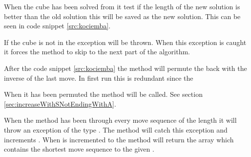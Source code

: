 When the cube has been solved from  it test if the length of the new solution is better than the old solution this will be saved as the new solution. 
This can be seen in code snippet \ref{src:kociemba}.

If the cube is not in   the exception  will be thrown.
 When this exception is caught it forces the  method to skip to the next part of the algorithm. 
 
\begin{comment}
 method to test if the cube is in \m{H}. 
 The method \vr{solveFromH} is called with a parameter, which determines how deep it will search.

If the \rubik{} is in \m{H} then \vr{solveFromH} will start solving it with \m{A} moves. If the \rubik{} is not inside \m{H} the \vr{solveFromH} will throw an exception called \vr{InvalidCubeException}. 

When the InvalidCubeException is caught by it cause 

\end{comment}

After the code snippet \ref{src:kociemba} the method will permute the \rubik{} back with the inverse of the last move. In first run this is redundant since the 

When it has been permuted the method  will be called. See section \ref{sec:increaseWithSNotEndingWithA}.

When the method  has been through every move sequence of the length  it will throw an exception of the type  
. The  method will catch this exception and increments . When  is incremented to  the method will return the array  which contains the shortest move sequence to the given \rubik{}.  
\begin{comment}
Thereafter it tests if \vr{d + c.length} > \vr{l}. 
If that is true, \vr{l} will be set equal to the sum of \vr{d + c.length} and the \vr{result} array will be initialized with the size \vr{l}. 
In the \vr{result} array the move sequence \vr{b} and the move sequence \vr{c} is added and the console will print the current \vr{result} and the time it took in seconds.

After the method has tested if \vr{d + c.length < l} the method will permute the \rubik{} back with the inverse of the last move. When it has been permuted the method \vr{increaseWithSNotEndingWithA} will be called. See section \ref{sec:increaseWithSNotEndingWithA}.

When the method \vr{increaseWithSNotEndingWithA} throws an exception of the type \vr{UnableToIncreaseMoveSequenceException} the method increments \vr{d}. 
When \vr{d} is incremented to \vr{l} the method will return the \vr{result} array.
\end{comment}